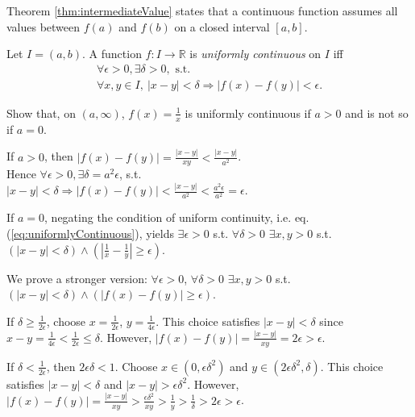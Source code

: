 \begin{rem}
Theorem \ref{thm:intermediateValue}
 states that a continuous function assumes
 all values between $f(a)$ and $f(b)$
 on a closed interval $[a,b]$.
\end{rem}

\begin{defn}
  \label{def:uniformlyContinuousScalar}
  Let $I=(a,b)$. A function $f: I\rightarrow \mathbb{R}$
  is \emph{uniformly continuous} on $I$
  iff
   \begin{equation}
     \label{eq:uniformlyContinuous}
     \begin{array}{l}
     \forall \epsilon>0, \exists \delta>0,\text{ s.t. }
     \\
     \forall x,y\in I,\ 
     |x-y|<\delta \Rightarrow |f(x)-f(y)|<\epsilon.
     \end{array}
   \end{equation}
\end{defn}

\begin{exc}
  Show that, on $(a,\infty)$,
  $f(x)=\frac{1}{x}$ is uniformly continuous
   if $a>0$ 
   and is not so if $a=0$.
\end{exc}
\begin{solution}
  If $a>0$, then
  $|f(x)-f(y)|=\frac{|x-y|}{xy} %
  <\frac{|x-y|}{a^2}$.\\
  Hence 
  $\forall \epsilon>0, \exists \delta=a^2 \epsilon$,
  s.t. \\$|x-y|<\delta \Rightarrow
  |f(x)-f(y)|<\frac{|x-y|}{a^2}<\frac{a^2 \epsilon}{a^2}=\epsilon$.

  If $a=0$, negating the condition
   of uniform continuity,
   i.e. eq. (\ref{eq:uniformlyContinuous}), yields
  $\exists \epsilon>0$ s.t. $\forall\delta>0$
   $\exists x,y>0$ s.t.
   $(|x-y|<\delta) \wedge (|\frac{1}{x}-\frac{1}{y}|\ge \epsilon)$.

   We prove a stronger version:
  $\forall \epsilon>0$, $\forall\delta>0$
   $\exists x,y>0$ s.t.
   $(|x-y|<\delta) \wedge (|f(x)-f(y)|\ge \epsilon)$.

  If $\delta\ge \frac{1}{2\epsilon}$,
   choose $x=\frac{1}{2\epsilon}$, $y=\frac{1}{4\epsilon}$.
  This choice satisfies $|x-y|<\delta$
   since $x-y=\frac{1}{4\epsilon}<\frac{1}{2\epsilon}\le \delta$.
  However, $|f(x)-f(y)|=\frac{|x-y|}{xy}=2\epsilon>\epsilon$.

  If $\delta< \frac{1}{2\epsilon}$,
   then $2\epsilon\delta<1$.
  Choose $x\in (0, \epsilon\delta^2)$
   and $y\in (2\epsilon\delta^2, \delta)$.
  This choice satisfies $|x-y|<\delta$
   and $|x-y|>\epsilon\delta^2$.
  However, 
   $|f(x)-f(y)|=\frac{|x-y|}{xy}>\frac{\epsilon\delta^2}{xy}
   > \frac{1}{y} > \frac{1}{\delta} > 2\epsilon> \epsilon$.
\end{solution}


